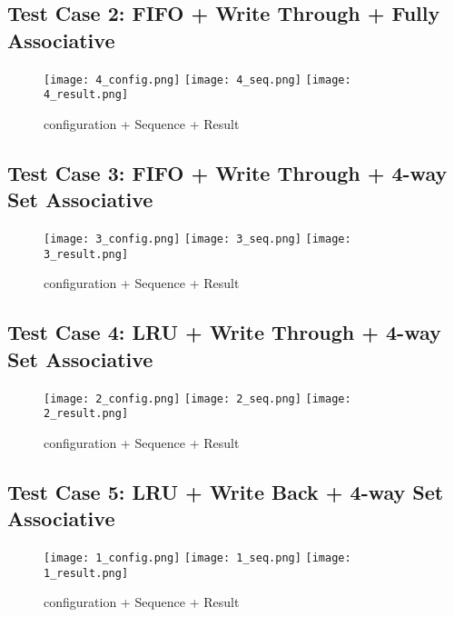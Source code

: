 \documentclass{article}
\begin{document}
\subsection{Test Case 2: FIFO + Write Through + Fully Associative}
\begin{figure}[H]{\centering}
    \texttt{[image: 4\_config.png]}
    \texttt{[image: 4\_seq.png]}
    \texttt{[image: 4\_result.png]}
    \caption[short]{configuration + Sequence + Result}
\end{figure}

\subsection{Test Case 3: FIFO + Write Through + 4-way Set Associative}
\begin{figure}[H]{\centering}
    \texttt{[image: 3\_config.png]}
    \texttt{[image: 3\_seq.png]}
    \texttt{[image: 3\_result.png]}
    \caption[short]{configuration + Sequence + Result}
\end{figure}

\subsection{Test Case 4: LRU + Write Through + 4-way Set Associative}
\begin{figure}[H]{\centering}
    \texttt{[image: 2\_config.png]}
    \texttt{[image: 2\_seq.png]}
    \texttt{[image: 2\_result.png]}
    \caption[short]{configuration + Sequence + Result}
\end{figure}

\subsection{Test Case 5: LRU + Write Back + 4-way Set Associative}
\begin{figure}[H]{\centering}
    \texttt{[image: 1\_config.png]}
    \texttt{[image: 1\_seq.png]}
    \texttt{[image: 1\_result.png]}
    \caption[short]{configuration + Sequence + Result}
\end{figure}
\end{document}
